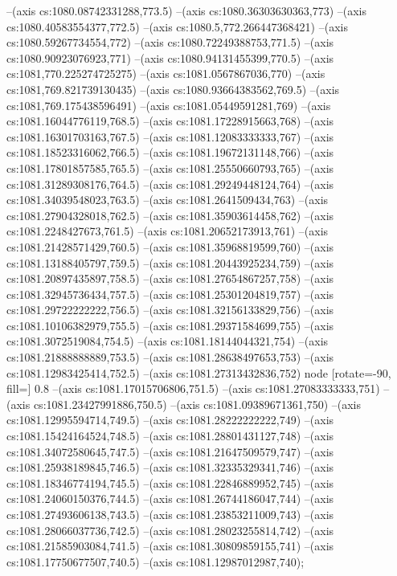 --(axis cs:1080.08742331288,773.5)
--(axis cs:1080.36303630363,773)
--(axis cs:1080.40583554377,772.5)
--(axis cs:1080.5,772.266447368421)
--(axis cs:1080.59267734554,772)
--(axis cs:1080.72249388753,771.5)
--(axis cs:1080.90923076923,771)
--(axis cs:1080.94131455399,770.5)
--(axis cs:1081,770.225274725275)
--(axis cs:1081.0567867036,770)
--(axis cs:1081,769.821739130435)
--(axis cs:1080.93664383562,769.5)
--(axis cs:1081,769.175438596491)
--(axis cs:1081.05449591281,769)
--(axis cs:1081.16044776119,768.5)
--(axis cs:1081.17228915663,768)
--(axis cs:1081.16301703163,767.5)
--(axis cs:1081.12083333333,767)
--(axis cs:1081.18523316062,766.5)
--(axis cs:1081.19672131148,766)
--(axis cs:1081.17801857585,765.5)
--(axis cs:1081.25550660793,765)
--(axis cs:1081.31289308176,764.5)
--(axis cs:1081.29249448124,764)
--(axis cs:1081.34039548023,763.5)
--(axis cs:1081.2641509434,763)
--(axis cs:1081.27904328018,762.5)
--(axis cs:1081.35903614458,762)
--(axis cs:1081.2248427673,761.5)
--(axis cs:1081.20652173913,761)
--(axis cs:1081.21428571429,760.5)
--(axis cs:1081.35968819599,760)
--(axis cs:1081.13188405797,759.5)
--(axis cs:1081.20443925234,759)
--(axis cs:1081.20897435897,758.5)
--(axis cs:1081.27654867257,758)
--(axis cs:1081.32945736434,757.5)
--(axis cs:1081.25301204819,757)
--(axis cs:1081.29722222222,756.5)
--(axis cs:1081.32156133829,756)
--(axis cs:1081.10106382979,755.5)
--(axis cs:1081.29371584699,755)
--(axis cs:1081.3072519084,754.5)
--(axis cs:1081.18144044321,754)
--(axis cs:1081.21888888889,753.5)
--(axis cs:1081.28638497653,753)
--(axis cs:1081.12983425414,752.5)
--(axis cs:1081.27313432836,752) node [rotate=-90, fill=\bgcol] {0.8}
--(axis cs:1081.17015706806,751.5)
--(axis cs:1081.27083333333,751)
--(axis cs:1081.23427991886,750.5)
--(axis cs:1081.09389671361,750)
--(axis cs:1081.12995594714,749.5)
--(axis cs:1081.28222222222,749)
--(axis cs:1081.15424164524,748.5)
--(axis cs:1081.28801431127,748)
--(axis cs:1081.34072580645,747.5)
--(axis cs:1081.21647509579,747)
--(axis cs:1081.25938189845,746.5)
--(axis cs:1081.32335329341,746)
--(axis cs:1081.18346774194,745.5)
--(axis cs:1081.22846889952,745)
--(axis cs:1081.24060150376,744.5)
--(axis cs:1081.26744186047,744)
--(axis cs:1081.27493606138,743.5)
--(axis cs:1081.23853211009,743)
--(axis cs:1081.28066037736,742.5)
--(axis cs:1081.28023255814,742)
--(axis cs:1081.21585903084,741.5)
--(axis cs:1081.30809859155,741)
--(axis cs:1081.17750677507,740.5)
--(axis cs:1081.12987012987,740);
